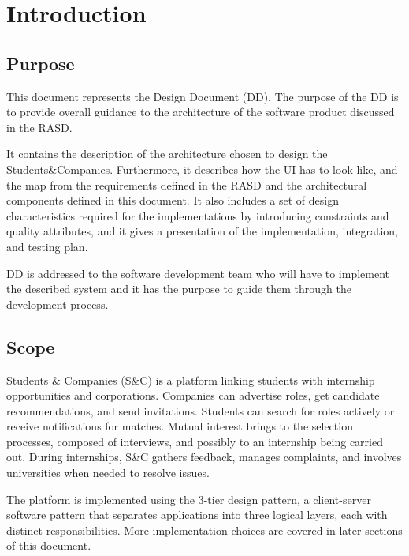 \chapter{Introduction}

\section{Purpose}
This document represents the Design Document (DD). The purpose of the DD is to provide overall guidance to the architecture of the software product discussed in the RASD.

It contains the description of the architecture chosen to design the Students\&Companies. Furthermore, it describes how the UI has to look like, and the map from the requirements defined in the RASD and the architectural components defined in this document.
It also includes a set of design characteristics required for the implementations by introducing constraints and quality attributes, and it gives a presentation of the implementation, integration, and testing plan.

DD is addressed to the software development team who will have to implement the described system and it has the purpose to guide them through the development process.


\section{Scope}
Students \& Companies (S\&C) is a platform linking students with internship opportunities and corporations. Companies can advertise roles, get candidate recommendations, and send invitations. Students can search for roles actively or receive notifications for matches. Mutual interest brings to the selection processes, composed of interviews, and possibly to an internship being carried out. During internships, S\&C gathers feedback, manages complaints, and involves universities when needed to resolve issues.

The platform is implemented using the 3-tier design pattern, a client-server software pattern that separates applications into three logical layers, each with distinct responsibilities.  
More implementation choices are covered in later sections of this document.


\pagebreak
